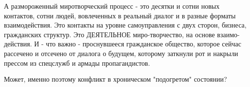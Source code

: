 А размороженный миротворческий процесс - это десятки и сотни новых контактов,
сотни людей, вовлеченных в реальный диалог и в разные форматы взаимодействия.
Это контакты на уровне самоуправления с двух сторон, бизнеса, гражданских
структур. Это ДЕЯТЕЛЬНОЕ миро-творчество, на основе взаимо-действия. И - что
важно - проснувшееся гражданское общество, которое сейчас рассечено и отсечено
от диалога о будущем, которому заткнули рот и накрыли прессом  из спецслужб и
армады пропагандистов. 

Может, именно поэтому конфликт в хроническом "подогретом" состоянии?

